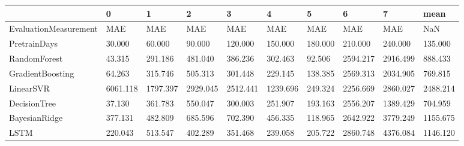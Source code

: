\begin{tabular}{llllllllll}
\toprule
{} &        0 &        1 &        2 &        3 &        4 &       5 &        6 &        7 &     mean \\
\midrule
EvaluationMeasurement &      MAE &      MAE &      MAE &      MAE &      MAE &     MAE &      MAE &      MAE &      NaN \\
PretrainDays          &   30.000 &   60.000 &   90.000 &  120.000 &  150.000 & 180.000 &  210.000 &  240.000 &  135.000 \\
RandomForest          &   43.315 &  291.186 &  481.040 &  386.236 &  302.463 &  92.506 & 2594.217 & 2916.499 &  888.433 \\
GradientBoosting      &   64.263 &  315.746 &  505.313 &  301.448 &  229.145 & 138.385 & 2569.313 & 2034.905 &  769.815 \\
LinearSVR             & 6061.118 & 1797.397 & 2929.045 & 2512.441 & 1239.696 & 249.324 & 2256.669 & 2860.027 & 2488.214 \\
DecisionTree          &   37.130 &  361.783 &  550.047 &  300.003 &  251.907 & 193.163 & 2556.207 & 1389.429 &  704.959 \\
BayesianRidge         &  377.131 &  482.809 &  685.596 &  702.390 &  456.335 & 118.965 & 2642.922 & 3779.249 & 1155.675 \\
LSTM                  &  220.043 &  513.547 &  402.289 &  351.468 &  239.058 & 205.722 & 2860.748 & 4376.084 & 1146.120 \\
\bottomrule
\end{tabular}
